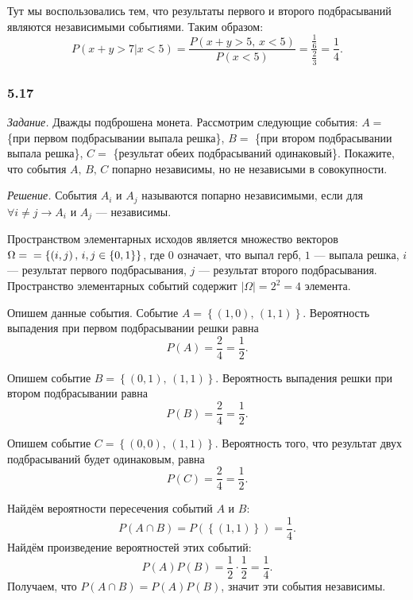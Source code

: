 Тут мы воспользовались тем, что результаты первого и второго подбрасываний являются независимыми событиями.
Таким образом:
$$P \left( \left. x+y>7 \right| x<5 \right) =
\frac{P \left( x+y>5, \, x<5 \right) }{P \left( x<5 \right) } =
\frac{ \frac{1}{6} }{ \frac{2}{3} } =
\frac{1}{4}.$$

\subsubsection*{5.17}

\textit{Задание.} Дважды подброшена монета.
Рассмотрим следующие события:
$A =$ \{при первом подбрасывании выпала решка\}, $B =$ \{при втором подбрасывании выпала решка\}, $C =$ \{результат обеих подбрасываний одинаковый\}.
Покажите, что события $A, \, B, \, C$ попарно независимы, но не независыми в совокупности.

\textit{Решение.} События $A_i$ и $A_j$ называются попарно независимыми, если для $ \forall i \neq j \rightarrow A_i $ и $A_j$ --- независимы.

Пространством элементарных исходов является множество векторов
$ \Omega = \\
= \left\{ \left( i, j \right), \, i, j \in \left\{ 0, 1 \right\} \right\}$,
где $0$ означает, что выпал герб, $1$ --- выпала решка, $i$ --- результат первого подбрасывания, $j$ --- результат второго подбрасывания.
Пространство элементарных событий содержит $ \left| \Omega \right| = 2^2 = 4$ элемента.

Опишем данные события.
Событие $A = \left\{ \left( 1, 0 \right), \, \left( 1, 1 \right) \right\} $.
Вероятность выпадения при первом подбрасывании решки равна
$$P \left( A \right) =
\frac{2}{4} =
\frac{1}{2}.$$

Опишем событие $B = \left\{ \left( 0, 1 \right), \, \left( 1, 1 \right) \right\} $.
Вероятность выпадения решки при втором подбрасывании равна
$$P \left( B \right) =
\frac{2}{4} =
\frac{1}{2}.$$

Опишем событие $C = \left\{ \left( 0, 0 \right), \, \left( 1, 1 \right) \right\} $.
Вероятность того, что результат двух подбрасываний будет одинаковым, равна
$$P \left( C \right) =
\frac{2}{4} =
\frac{1}{2}.$$

Найдём вероятности пересечения событий $A$ и $B$:
$$P \left( A \cap B \right) =
P \left( \left\{ \left( 1, 1 \right) \right\} \right) =
\frac{1}{4}.$$
Найдём произведение вероятностей этих событий:
$$P \left( A \right) P \left( B \right) =
\frac{1}{2} \cdot \frac{1}{2} =
\frac{1}{4}.$$
Получаем, что $P \left( A \cap B \right) = P \left( A \right) P \left( B \right) $, значит эти события независимы.


